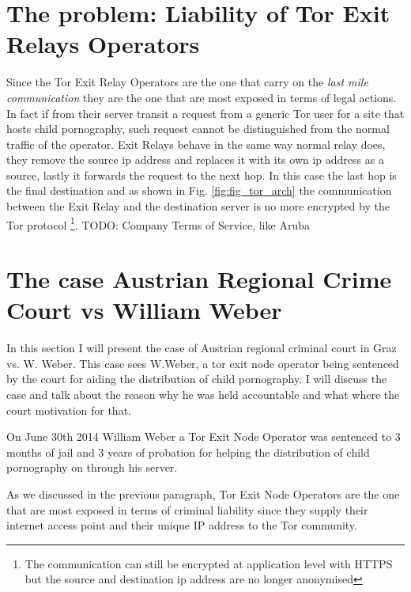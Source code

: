 \documentclass[runningheads,a4paper]{llncs}
\begin{document}
\section{The problem: Liability of Tor Exit Relays Operators}
Since the Tor Exit Relay Operators are the one that carry on the \textit{last mile communication} they are the one that are most exposed in terms of legal actions. In fact if from their server transit a request from a generic Tor user for a site that hosts child pornography, such request cannot be distinguished from the normal traffic of the operator. 
Exit Relays behave in the same way normal relay does, they remove the source ip address and replaces it with its own ip address as a source, lastly it forwards the request to the next hop. In this case the last hop is the final destination and as shown in Fig. \ref{fig:fig_tor_arch} the communication between the Exit Relay and the destination server is no more encrypted by the Tor protocol \footnote{The communication can still be encrypted at application level with HTTPS but the source and destination ip address are no longer anonymised}. 
TODO: Company Terms of Service, like Aruba

\section{The case Austrian Regional Crime Court vs William Weber}
In this section I will present the case of Austrian regional criminal court in Graz vs. W. Weber. This case sees W.Weber, a tor exit node operator being sentenced by the court for aiding the distribution of child pornography. I will discuss the case and talk about the reason why he was held accountable and what where the court motivation for that.

On June 30th 2014 William Weber a Tor Exit Node Operator was sentenced to 3 months of jail and 3 years of probation for helping the distribution of child pornography on through his server.

As we discussed in the previous paragraph, Tor Exit Node Operators are the one that are most exposed in terms of criminal liability since they supply their internet access point and their unique IP address to the Tor community.
\end{document}
